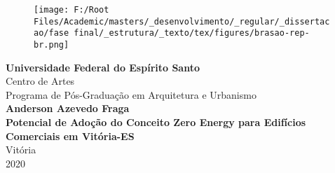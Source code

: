 \documentclass[a4paper, 12pt]{article}
\begin{document}
\begin{titlepage}
    \begin{center}
        \begin{figure}
            \centering
            \texttt{[image: F:/Root Files/Academic/masters/\_desenvolvimento/\_regular/\_dissertacao/fase final/\_estrutura/\_texto/tex/figures/brasao-rep-br.png]}
        \end{figure}
        \vspace*{0.1cm}
        \textbf{\large Universidade Federal do Espírito Santo}\\
        \large Centro de Artes\\
        \large Programa de Pós-Graduação em Arquitetura e Urbanismo\\
        \vspace*{3cm}
        \textbf{\large Anderson Azevedo Fraga}\\
        \vspace*{4cm}
        \textbf{Potencial de Adoção do Conceito Zero Energy para Edifícios Comerciais em Vitória-ES}\\
        \vfill %
        Vitória\\
        2020

    \end{center}
\end{titlepage}


\thispagestyle{empty} %
\pagebreak



\listoffigures\pagebreak
\listoftables\pagebreak
\tableofcontents\pagebreak









%
\printbibliography
\end{document}
